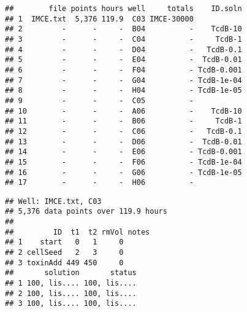 \singlespacing
\begin{knitrout}
\color{fgcolor}\begin{kframe}
\begin{alltt}
 \hlkwb{=} 
     \hlstd{=} \hlstd{,}  \hlstd{=} \hlstd{,}
     \hlstd{=} \hlstd{,}
     \hlstd{=} \hlstd{)}
\end{alltt}
\begin{verbatim}
##        file points hours well     totals    ID.soln
## 1  IMCE.txt  5,376 119.9  C03 IMCE-30000           
## 2         -      -     -  B04          -    TcdB-10
## 3         -      -     -  C04          -     TcdB-1
## 4         -      -     -  D04          -   TcdB-0.1
## 5         -      -     -  E04          -  TcdB-0.01
## 6         -      -     -  F04          - TcdB-0.001
## 7         -      -     -  G04          - TcdB-1e-04
## 8         -      -     -  H04          - TcdB-1e-05
## 9         -      -     -  C05          -           
## 10        -      -     -  A06          -    TcdB-10
## 11        -      -     -  B06          -     TcdB-1
## 12        -      -     -  C06          -   TcdB-0.1
## 13        -      -     -  D06          -  TcdB-0.01
## 14        -      -     -  E06          - TcdB-0.001
## 15        -      -     -  F06          - TcdB-1e-04
## 16        -      -     -  G06          - TcdB-1e-05
## 17        -      -     -  H06          -
\end{verbatim}
\begin{alltt}
\hlstd{(subset[[}\hlstd{]])}
\end{alltt}
\begin{verbatim}
## Well: IMCE.txt, C03
## 5,376 data points over 119.9 hours
## 
##         ID  t1  t2 rmVol notes
## 1    start   0   1     0      
## 2 cellSeed   2   3     0      
## 3 toxinAdd 449 450     0      
##       solution       status
## 1 100, lis.... 100, lis....
## 2 100, lis.... 100, lis....
## 3 100, lis.... 100, lis....
\end{verbatim}
\begin{alltt}
 \hlkwb{=} \hlstd{subset[[}\hlstd{]]}\hlopt{$}\hlopt{$}

\end{alltt}
\end{kframe}
\end{knitrout}
